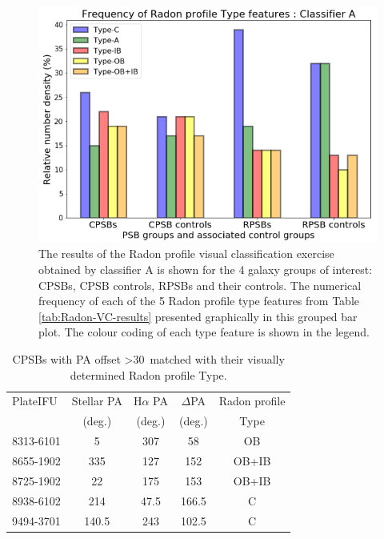 \begin{figure}
    \centering
    \includegraphics[width=\columnwidth]{images/JupyterPlots/PROFILE-GROUPS-CLASSIFIER-A.png}
    \caption[Radon profile Type classifications determined by classifier A]{The results of the Radon profile visual classification exercise obtained by classifier A is shown for the 4 galaxy groups of interest: CPSBs, CPSB controls, RPSBs and their controls. The numerical frequency of each of the 5 Radon profile type features from Table \ref{tab:Radon-VC-results} presented graphically in this grouped bar plot. The colour coding of each type feature is shown in the legend.}
    \label{fig:Radon-grouped-barchart}
\end{figure}

\begin{table}
\centering
\caption{CPSBs with PA offset \textgreater 30\textdegree\ matched with their visually determined Radon profile Type.}
\label{tab:offsetCPSBs-Radon-Type}
\begin{tabular}{lcccc}
\hline
PlateIFU  & Stellar PA & H$\alpha$ PA & $\Delta$PA & Radon profile\\
  & (deg.) & (deg.) & (deg.) & Type \\
\hline
8313-6101 & 5 & 307 & 58 & OB \\
8655-1902 & 335 & 127 & 152 & OB+IB \\
8725-1902 & 22 & 175 & 153 & OB+IB \\
8938-6102 & 214 & 47.5 & 166.5 & C \\
9494-3701 & 140.5 & 243 & 102.5 & C \\
\hline
\end{tabular}
\end{table}

